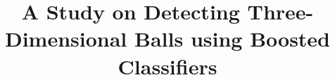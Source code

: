 \documentclass{sig-alternate-05-2015}
\begin{document}
	\title{A Study on Detecting Three-Dimensional Balls using Boosted Classifiers}
\end{document}

